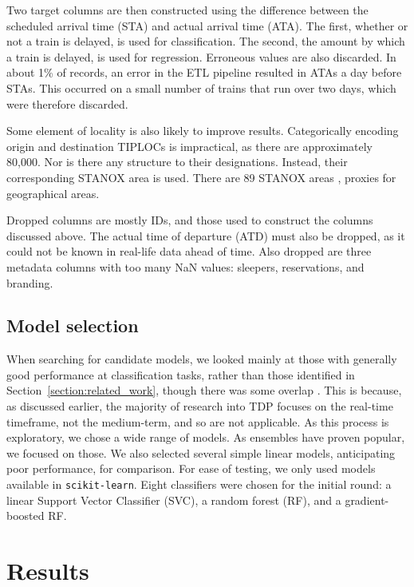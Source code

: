 \documentclass[12pt,a4paper]{article}
\begin{document}
Two target columns are then constructed using the difference between the scheduled arrival time (STA) and actual arrival time (ATA). The first, whether or not a train is delayed, is used for classification. The second, the amount by which a train is delayed, is used for regression. Erroneous values are also discarded. In about 1\% of records, an error in the ETL pipeline resulted in ATAs a day before STAs. This occurred on a small number of trains that run over two days, which were therefore discarded.

Some element of locality is also likely to improve results. Categorically encoding origin and destination TIPLOCs is impractical, as there are approximately 80,000. Nor is there any structure to their designations. Instead, their corresponding STANOX area is used. There are 89 STANOX areas , proxies for geographical areas.

Dropped columns are mostly IDs, and those used to construct the columns discussed above. The actual time of departure (ATD) must also be dropped, as it could not be known in real-life data ahead of time. Also dropped are three metadata columns with too many NaN values: sleepers, reservations, and branding. 

\subsection{Model selection}
\label{subsection:model_selection}

When searching for candidate models, we looked mainly at those with generally good performance at classification tasks, rather than those identified in Section~\ref{section:related_work}, though there was some overlap \cite{wang_zhang_2019,wang_work_2015}. This is because, as discussed earlier, the majority of research into TDP focuses on the real-time timeframe, not the medium-term, and so are not applicable. As this process is exploratory, we chose a wide range of models. As ensembles have proven popular, we focused on those. We also selected several simple linear models, anticipating poor performance, for comparison. For ease of testing, we only used models available in \verb|scikit-learn|. Eight classifiers were chosen for the initial round: a linear Support Vector Classifier (SVC), a random forest (RF), and a gradient-boosted RF.

\clearpage
\section{Results}
\end{document}
